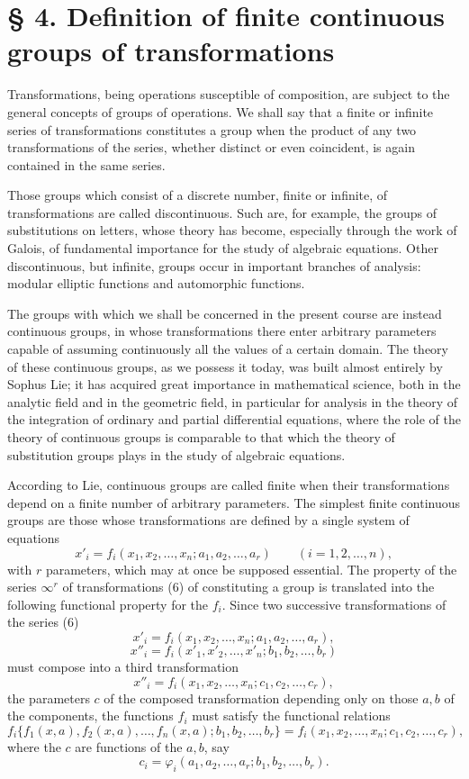 \documentclass[11pt]{book}
\begin{document}
\section*{\S{} 4. Definition of finite continuous groups of transformations}

Transformations, being operations susceptible of composition, are subject to the general concepts of groups of operations. We shall say that a finite or infinite series of transformations constitutes a group when the product of any two transformations of the series, whether distinct or even coincident, is again contained in the same series.

Those groups which consist of a discrete number, finite or infinite, of transformations are called discontinuous. Such are, for example, the groups of substitutions on letters, whose theory has become, especially through the work of Galois, of fundamental importance for the study of algebraic equations. Other discontinuous, but infinite, groups occur in important branches of analysis: modular elliptic functions and automorphic functions.

The groups with which we shall be concerned in the present course are instead continuous groups, in whose transformations there enter arbitrary parameters capable of assuming continuously all the values of a certain domain. The theory of these continuous groups, as we possess it today, was built almost entirely by Sophus Lie; it has acquired great importance in mathematical science, both in the analytic field and in the geometric field, in particular for analysis in the theory of the integration of ordinary and partial differential equations, where the role of the theory of continuous groups is comparable to that which the theory of substitution groups plays in the study of algebraic equations.

According to Lie, continuous groups are called finite when their transformations depend on a finite number of arbitrary parameters. The simplest finite continuous groups are those whose transformations are defined by a single system of equations
\begin{equation*}\tag{6}
 x'_i=f_i(x_1,x_2,\ldots,x_n;a_1,a_2,\ldots,a_r)\qquad (i=1,2,\ldots,n),
\end{equation*}
with $r$ parameters, which may at once be supposed essential. The property of the series $\infty^r$ of transformations (6) of constituting a group is translated into the following functional property for the $f_i$. Since two successive transformations of the series (6)
\[
 x'_i=f_i(x_1,x_2,\ldots,x_n;a_1,a_2,\ldots,a_r),
\]
\[
 x''_i=f_i(x'_1,x'_2,\ldots,x'_n;b_1,b_2,\ldots,b_r)
\]
must compose into a third transformation
\[
 x''_i=f_i(x_1,x_2,\ldots,x_n;c_1,c_2,\ldots,c_r),
\]
the parameters $c$ of the composed transformation depending only on those $a,b$ of the components, the functions $f_i$ must satisfy the functional relations
\[
 f_i\{f_1(x,a),f_2(x,a),\ldots,f_n(x,a);b_1,b_2,\ldots,b_r\}=f_i(x_1,x_2,\ldots,x_n;c_1,c_2,\ldots,c_r),
\]
where the $c$ are functions of the $a,b$, say
\[
 c_i=\varphi_i(a_1,a_2,\ldots,a_r;b_1,b_2,\ldots,b_r).
\]
\end{document}

